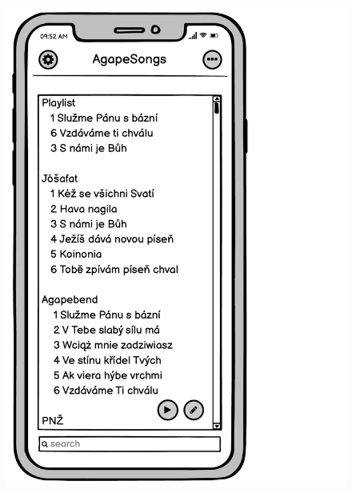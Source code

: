 \begin{figure}
    \includegraphics[width=\textwidth/3 - 2pt]{images/3-navrh/3-6-seznam-zpevniku.pdf}

\end{figure}
